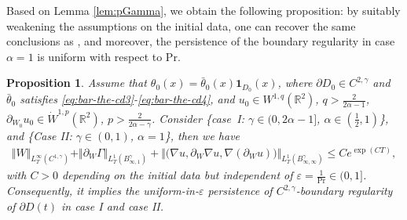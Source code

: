 \documentclass[reqno,11pt,a4paper]{amsart}
\newtheorem{proposition}[theorem]{Proposition}
\begin{document}
Based on Lemma \ref{lem:pGamma}, we obtain the following proposition: by suitably weakening the assumptions on the initial data, 
one can recover the same conclusions as \cite{LXY25}, 
and moreover, the persistence of the boundary regularity in case $\alpha=1$ is uniform with respect to $\mathrm{Pr}$.
\begin{proposition}\label{prop:pGamma-low}
Assume that $\theta_0(x) =\bar{\theta}_0(x) \mathbf{1}_{D_0}(x)$, where
$\partial D_0\in C^{2,\gamma}$ and $\bar{\theta}_0$ satisfies \eqref{eq:bar-the-cd3}-\eqref{eq:bar-the-cd4},
and $u_0\in W^{1,q}(\mathbb{R}^2)$, $q>\frac{2}{2\alpha-1}$, $\partial_{W_0}u_0\in \dot W^{1,p}(\mathbb{R}^2)$, $p>\frac{2}{2\alpha-\gamma}$.
Consider \{\textrm{case\, I}: $\gamma\in(0,2\alpha-1]$, $\alpha\in(\tfrac{1}{2},1)$\},
and \{\textrm{Case II}: $\gamma\in(0,1)$, $\alpha=1$\}, 
then we have 
\begin{align}\label{nab-W-Cgam-es}
  \Vert W\Vert _{L^\infty_T(C^{1,\gamma})}  
  + \Vert \partial_W \Gamma\Vert _{L^1_T(B^\gamma_{\infty,1})}  
  + \big\Vert \big(\nabla u, \partial_W \nabla u, \nabla (\partial_W u)\big)\big\Vert _{L^1_T (B^\gamma_{\infty,\infty})} 
  \leq C e^{\exp(CT)},
\end{align}
with $C>0$ depending on the initial data but independent of $\varepsilon=\frac{1}{\mathrm{Pr}}\in (0,1]$.
Consequently, it implies the uniform-in-$\varepsilon$ persistence of $C^{2,\gamma}$-boundary regularity of $\partial D(t)$
in case I and case II.
\end{proposition}

\end{document}
